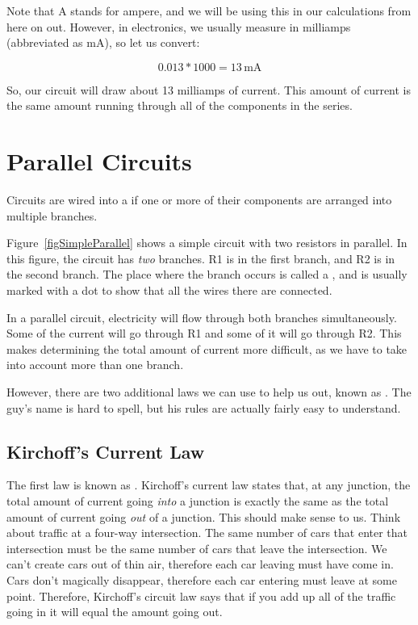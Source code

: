 Note that \si{\ampere} stands for ampere, and we will be using this in our calculations from here on out.
However, in electronics, we usually measure in milliamps (abbreviated as \si{\milli\ampere}), so let us convert:

$$ 0.013 * 1000 = 13\,\si{\milli\ampere}$$

So, our circuit will draw about 13 milliamps of current.
This amount of current is the same amount running through all of the components in the series.

\section{Parallel Circuits}

Circuits are wired into a  if one or more of their components are arranged into multiple branches.

Figure~\ref{figSimpleParallel} shows a simple circuit with two resistors in parallel.
In this figure, the circuit has \emph{two} branches.
R1 is in the first branch, and R2 is in the second branch.
The place where the branch occurs is called a , and is usually marked with a dot to show that all the wires there are connected.


In a parallel circuit, electricity will flow through both branches simultaneously.
Some of the current will go through R1 and some of it will go through R2.
This makes determining the total amount of current more difficult, as we have to take into account more than one branch.

However, there are two additional laws we can use to help us out, known as .
The guy's name is hard to spell, but his rules are actually fairly easy to understand.

\subsection{Kirchoff's Current Law}

The first law is known as .
Kirchoff's current law states that, at any junction, the total amount of current going \emph{into} a junction is exactly the same as the total amount of current going \emph{out} of a junction.
This should make sense to us.
Think about traffic at a four-way intersection.
The same number of cars that enter that intersection must be the same number of cars that leave the intersection.
We can't create cars out of thin air, therefore each car leaving must have come in.
Cars don't magically disappear, therefore each car entering must leave at some point.
Therefore, Kirchoff's circuit law says that if you add up all of the traffic going in it will equal the amount going out.

